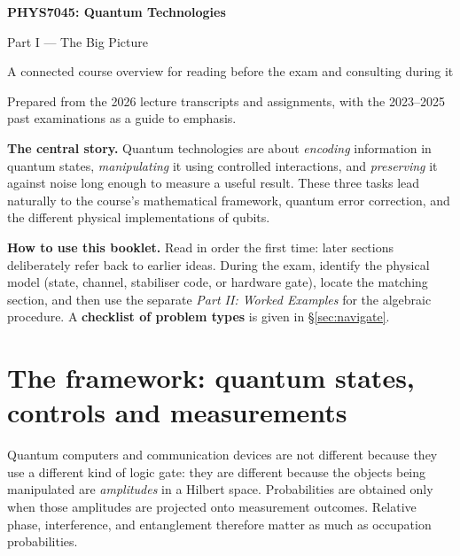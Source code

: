 \begin{center}
{\huge\bfseries PHYS7045: Quantum Technologies}\par
\vspace{2mm}
{\Large\color{accent}Part I --- The Big Picture}\par
\vspace{2mm}
{\small A connected course overview for reading before the exam and consulting during it}\par
\vspace{2mm}
{\small Prepared from the 2026 lecture transcripts and assignments, with the 2023--2025 past examinations as a guide to emphasis.}\par
\end{center}
\vspace{-2mm}
\begin{bigidea}
\textbf{The central story.} Quantum technologies are about \emph{encoding} information in quantum states, \emph{manipulating} it using controlled interactions, and \emph{preserving} it against noise long enough to measure a useful result. These three tasks lead naturally to the course's mathematical framework, quantum error correction, and the different physical implementations of qubits.
\end{bigidea}
\tableofcontents
\vspace{2mm}
\begin{examtip}
\textbf{How to use this booklet.} Read in order the first time: later sections deliberately refer back to earlier ideas. During the exam, identify the physical model (state, channel, stabiliser code, or hardware gate), locate the matching section, and then use the separate \emph{Part II: Worked Examples} for the algebraic procedure. A \textbf{checklist of problem types} is given in \S\ref{sec:navigate}.
\end{examtip}

\section{The framework: quantum states, controls and measurements}\label{sec:states}
Quantum computers and communication devices are not different because they use a different kind of logic gate: they are different because the objects being manipulated are \emph{amplitudes} in a Hilbert space. Probabilities are obtained only when those amplitudes are projected onto measurement outcomes. Relative phase, interference, and entanglement therefore matter as much as occupation probabilities.

